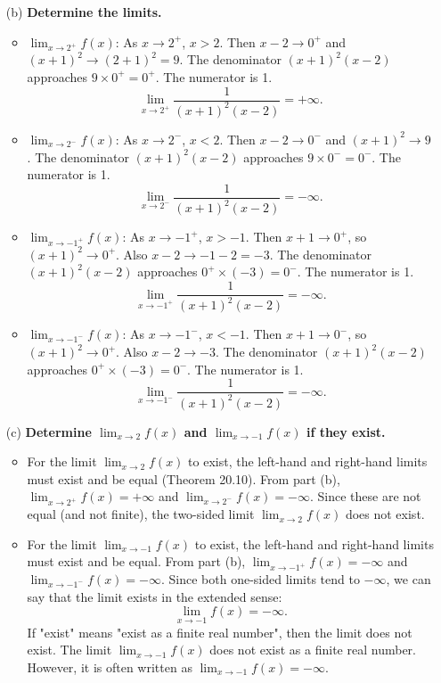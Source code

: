 \documentclass{article}
\begin{document}
\begin{enumerate}
  \item[(b)] \textbf{Determine the limits.}
    \begin{itemize}
        \item \(\lim_{x\to 2^+} f(x)\): As \(x \to 2^+\), \(x > 2\). Then \(x-2 \to 0^+\) and \((x+1)^2 \to (2+1)^2 = 9\). The denominator \((x+1)^2 (x-2)\) approaches \(9 \times 0^+ = 0^+\). The numerator is 1.
            \[ \lim_{x\to 2^+} \frac{1}{(x+1)^2 (x-2)} = +\infty. \]
        \item \(\lim_{x\to 2^-} f(x)\): As \(x \to 2^-\), \(x < 2\). Then \(x-2 \to 0^-\) and \((x+1)^2 \to 9\). The denominator \((x+1)^2 (x-2)\) approaches \(9 \times 0^- = 0^-\). The numerator is 1.
            \[ \lim_{x\to 2^-} \frac{1}{(x+1)^2 (x-2)} = -\infty. \]
        \item \(\lim_{x\to -1^+} f(x)\): As \(x \to -1^+\), \(x > -1\). Then \(x+1 \to 0^+\), so \((x+1)^2 \to 0^+\). Also \(x-2 \to -1-2 = -3\). The denominator \((x+1)^2 (x-2)\) approaches \(0^+ \times (-3) = 0^-\). The numerator is 1.
            \[ \lim_{x\to -1^+} \frac{1}{(x+1)^2 (x-2)} = -\infty. \]
        \item \(\lim_{x\to -1^-} f(x)\): As \(x \to -1^-\), \(x < -1\). Then \(x+1 \to 0^-\), so \((x+1)^2 \to 0^+\). Also \(x-2 \to -3\). The denominator \((x+1)^2 (x-2)\) approaches \(0^+ \times (-3) = 0^-\). The numerator is 1.
            \[ \lim_{x\to -1^-} \frac{1}{(x+1)^2 (x-2)} = -\infty. \]
    \end{itemize}

  \item[(c)] \textbf{Determine \(\lim_{x\to 2} f(x)\) and \(\lim_{x\to -1} f(x)\) if they exist.}
    \begin{itemize}
        \item For the limit \(\lim_{x\to 2} f(x)\) to exist, the left-hand and right-hand limits must exist and be equal (Theorem 20.10).
            From part (b), \(\lim_{x\to 2^+} f(x) = +\infty\) and \(\lim_{x\to 2^-} f(x) = -\infty\). Since these are not equal (and not finite), the two-sided limit \(\lim_{x\to 2} f(x)\) does not exist.

        \item For the limit \(\lim_{x\to -1} f(x)\) to exist, the left-hand and right-hand limits must exist and be equal.
            From part (b), \(\lim_{x\to -1^+} f(x) = -\infty\) and \(\lim_{x\to -1^-} f(x) = -\infty\). Since both one-sided limits tend to \(-\infty\), we can say that the limit exists in the extended sense:
            \[ \lim_{x\to -1} f(x) = -\infty. \]
            If "exist" means "exist as a finite real number", then the limit does not exist. The limit \(\lim_{x\to -1} f(x)\) does not exist as a finite real number. However, it is often written as \( \lim_{x\to -1} f(x) = -\infty \).
    \end{itemize}
\end{enumerate}
\end{document}
